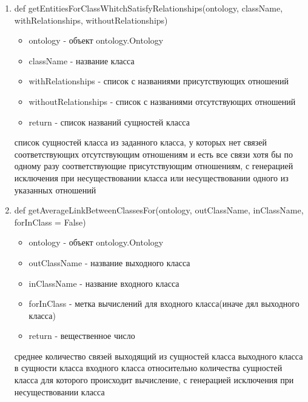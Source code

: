 \documentclass{article}
\begin{document}
\begin{enumerate}
		\item def getEntitiesForClassWhitchSatisfyRelationships(ontology, className, withRelationships, withoutRelationships)
		\begin{itemize}
			\item ontology - объект ontology.Ontology
			\item className - название класса
			\item withRelationships - список с названиями присутствующих отношений
			\item withoutRelationships - список с названиями отсутствующих отношений
			\item return - список названий сущностей класса
		\end{itemize}
		список сущностей класса из заданного класса, у которых нет связей соответствующих отсутствующим отношениям и есть все связи хотя бы по одному разу соответствующие присутствующим отношениям, с генерацией исключения при несуществовании класса или несуществовании одного из указанных отношений
		
		\item def getAverageLinkBetweenClassesFor(ontology, outClassName, inClassName, forInClass = False)
		\begin{itemize}
			\item ontology - объект ontology.Ontology
			\item outClassName - название выходного класса
			\item inClassName - название входного класса
			\item forInClass - метка вычислений для входного класса(иначе дял выходного класса)
			\item return - вещественное число
		\end{itemize}
		среднее количество связей выходящий из сущностей класса выходного класса в сущности класса входного класса относительно количества сущностей класса для которого происходит вычисление, с генерацией исключения при несуществовании класса
		

\end{enumerate}
\end{document}
